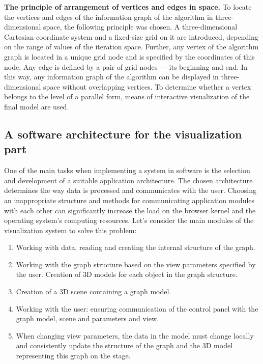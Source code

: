 \textbf{The principle of arrangement of vertices and edges in space.} To locate the vertices and edges of the information graph of the algorithm in three-dimensional space, the following principle was chosen. A three-dimensional Cartesian coordinate system and a fixed-size grid on it are introduced, depending on the range of values of the iteration space. Further, any vertex of the algorithm graph is located in a unique grid node and is specified by the coordinates of this node. Any edge is defined by a pair of grid nodes --- its beginning and end. In this way, any information graph of the algorithm can be displayed in three-dimensional space without overlapping vertices. To determine whether a vertex belongs to the level of a parallel form, means of interactive visualization of the final model are used.

\subsection{A software architecture for the visualization part}

One of the main tasks when implementing a system in software is the selection and development of a suitable application architecture. The chosen architecture determines the way data is processed and communicates with the user. Choosing an inappropriate structure and methods for communicating application modules with each other can significantly increase the load on the browser kernel and the operating system's computing resources. Let's consider the main modules of the visualization system to solve this problem:

\begin{enumerate}
    \item Working with data, reading and creating the internal structure of the graph.
    \item Working with the graph structure based on the view parameters specified by the user. Creation of 3D models for each object in the graph structure.
    \item Creation of a 3D scene containing a graph model.
    \item Working with the user: ensuring communication of the control panel with the graph model, scene and parameters and view.
    \item When changing view parameters, the data in the model must change locally and consistently update the structure of the graph and the 3D model representing this graph on the stage.
\end{enumerate}

